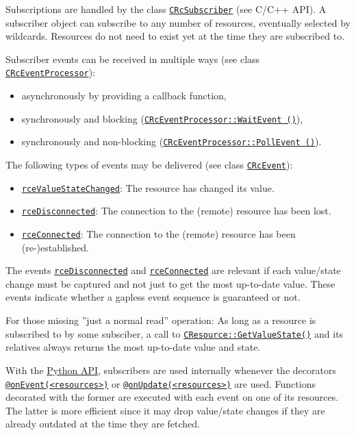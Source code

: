 \documentclass[12pt,english,parskip=half,headheight=19pt]{scrreprt}
\newcommand{\refdoc}[2]{\href{#1}{#2}}              %
\newcommand{\refapic}[1]{\href{home2l-api_c/index.html}{\mbox{\texttt{#1}}}}            %
\newcommand{\refapipython}[1]{\href{home2l-api_python/index.html}{\mbox{\texttt{#1}}}}  %
\newcommand{\theapipython}{\refdoc{home2l-api_python/index.html}{Python API}}
\begin{document}
Subscriptions are handled by the class \refapic{CRcSubscriber} (see C/C++ API). A subscriber object can subscribe to any number of resources, eventually selected by wildcards. Resources do not need to exist yet at the time they are subscribed to.

Subscriber events can be received in multiple ways (see class \refapic{CRcEventProcessor}):

\begin{itemize}
  \item
    asynchronously by providing a callback function,
  \item
    synchronously and blocking (\refapic{CRcEventProcessor::WaitEvent ()}),
  \item
    synchronously and non-blocking (\refapic{CRcEventProcessor::PollEvent ()}).
\end{itemize}

The following types of events may be delivered (see class \refapic{CRcEvent}):

\begin{itemize}
  \item
    \refapic{rceValueStateChanged}: The resource has changed its value.
  \item
    \refapic{rceDisconnected}: The connection to the (remote) resource has been lost.
  \item
    \refapic{rceConnected}: The connection to the (remote) resource has been (re-)established.
\end{itemize}

The events \refapic{rceDisconnected} and \refapic{rceConnected} are relevant if each value/state change must be captured and not just to get the most up-to-date value. These events indicate whether a gapless event sequence is guaranteed or not.

For those missing ''just a normal read'' operation: As long as a resource is subscribed to by some subsciber, a call to \refapic{CResource::GetValueState()} and its relatives always returns the most up-to-date value and state.

With the \theapipython{}, subscribers are used internally whenever the decorators \refapipython{@onEvent(<resources>)} or \refapipython{@onUpdate(<resources>)} are used. Functions decorated with the former are executed with each event on one of its resources. The latter is more efficient since it may drop value/state changes if they are already outdated at the time they are fetched.
\end{document}
